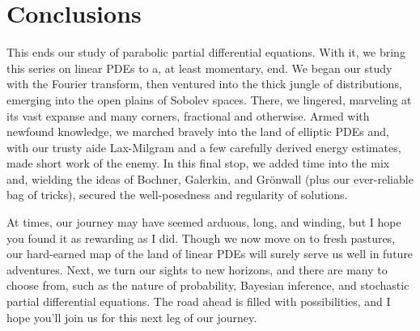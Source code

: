 \documentclass[
    a4paper,
    DIV=14,
    abstract=true,
    numbers=noenddot
]{scrartcl}
\begin{document}
\section{Conclusions}
This ends our study of parabolic partial differential equations. With it, we bring this series on linear PDEs to a, at least momentary, end. We began our study with the Fourier transform, then ventured into the thick jungle of distributions, emerging into the open plains of Sobolev spaces. There, we lingered, marveling at its vast expanse and many corners, fractional and otherwise. Armed with newfound knowledge, we marched bravely into the land of elliptic PDEs and, with our trusty aide Lax-Milgram and a few carefully derived energy estimates, made short work of the enemy. In this final stop, we added time into the mix and, wielding the ideas of Bochner, Galerkin, and Grönwall (plus our ever-reliable bag of tricks), secured the well-posedness and regularity of solutions.

At times, our journey may have seemed arduous, long, and winding, but I hope you found it as rewarding as I did. Though we now move on to fresh pastures, our hard-earned map of the land of linear PDEs will surely serve us well in future adventures. Next, we turn our sights to new horizons, and there are many to choose from, such as the nature of probability, Bayesian inference, and stochastic partial differential equations. The road ahead is filled with possibilities, and I hope you'll join us for this next leg of our journey.




\end{document}

